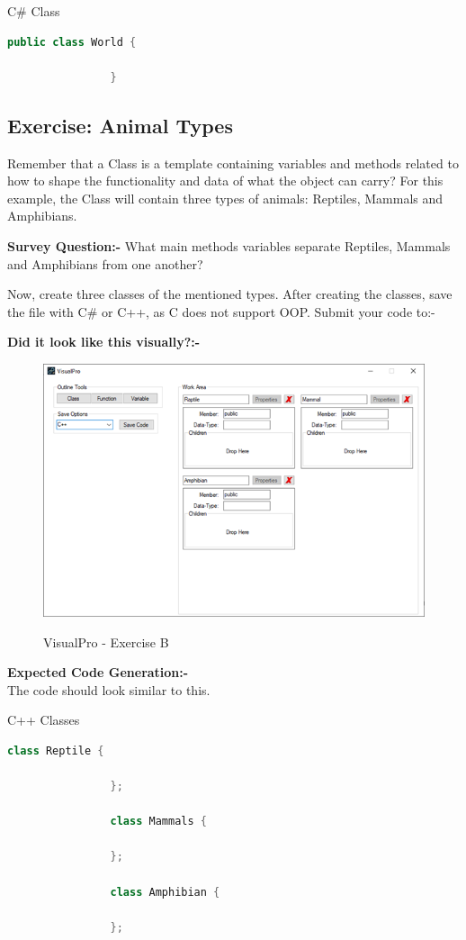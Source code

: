 \documentclass[10pt]{article}
\begin{document}
        \begin{example}{C\# Class}
            \begin{lstlisting}[language=java]
                public class World {

                }
            \end{lstlisting}
        \end{example}
    \newpage
    \subsection{Exercise: Animal Types}
        Remember that a Class is a template containing variables and methods related to how to shape the functionality and data of what the object can carry? For this example, the Class will contain three types of animals: Reptiles, Mammals and Amphibians.
        
        \textbf{Survey Question:-} What main methods variables separate Reptiles, Mammals and Amphibians from one another?

        Now, create three classes of the mentioned types. After creating the classes, save the file with C\# or C++, as C does not support OOP. Submit your code to:-

        \textbf{Did it look like this visually?:-} 
        \begin{figure}[h]
            \centering
            {\includegraphics[scale=0.75]{Figures/Exercises/SecC-1.png}}
            \caption{VisualPro - Exercise B}
            \label{fig:vp-eB}
        \end{figure}

        \textbf{Expected Code Generation:-}\\
        The code should look similar to this.
        \begin{example}{C++ Classes}
            \begin{lstlisting}[language=c++]
                class Reptile {

                };

                class Mammals {

                };

                class Amphibian {

                };
            \end{lstlisting}
        \end{example}
\end{document}
